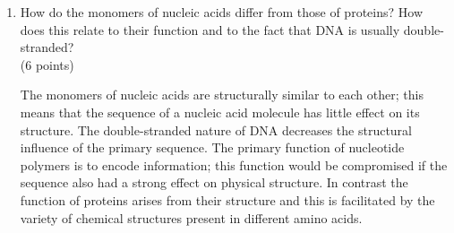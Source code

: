 \documentclass[11pt]{article}
\begin{document}
\begin{enumerate}
\item How do the monomers of nucleic acids differ from those of proteins? How
  does this relate to their function and to the fact that DNA is usually double-stranded?\\
(6 points)

\begin{Notes}
  The monomers of nucleic acids are structurally similar to each other; this
  means that the sequence of a nucleic acid molecule has little effect on its
  structure. The double-stranded nature of DNA decreases the structural
  influence of the primary sequence. The primary function of nucleotide
  polymers is to encode information; this function would be compromised if the
  sequence also had a strong effect on physical structure. In contrast the
  function of proteins arises from their structure and this is facilitated by
  the variety of chemical structures present in different amino acids.
\end{Notes}
\end{enumerate}
\end{document}
